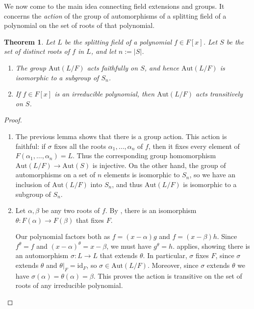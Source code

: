 \documentclass[12pt]{report}
\newtheorem{theorem}{Theorem}[chapter]
\numberwithin{equation}{section}
\numberwithin{theorem}{chapter}
\theoremstyle{definition}
\newtheorem*{basic properties}{Basic Properties}
\newtheorem*{Important Remark}{Important Remark}
\begin{document}
We now come to the main idea connecting field extensions and groups. It concerns the {\em action} of the group of automorphisms of a splitting field of a polynomial on the set of roots of that polynomial.

\begin{theorem}\label{aut splitting field sn}
Let $L$ be the splitting field of a polynomial $f \in F[x]$. Let $S$ be the set of distinct roots of $f$ in $L$, and let $n := |S|$. 

\begin{enumerate}[label=\alph*),leftmargin=15pt]
\item The group $\mathrm{Aut}(L/F)$ acts faithfully on $S$, and hence $\mathrm{Aut}(L/F)$ is isomorphic to a subgroup of $S_n$. 
\item If $f \in F[x]$ is an irreducible polynomial, then $\mathrm{Aut}(L/F)$ acts transitively on $S$.
\end{enumerate}
\end{theorem}


\begin{proof}$\,$
\begin{enumerate}[label=\alph*),leftmargin=15pt]
\item The previous lemma shows that there is a group action. This action is faithful: if $\sigma$ fixes all the roots $\alpha_1, \dots, \alpha_n$ of $f$, then it fixes every element of $F(\alpha_1, \dots, \alpha_n) = L$. Thus the corresponding group homomorphism $\mathrm{Aut}(L/F) \to \mathrm{Aut}(S)$ is injective. On the other hand, the group of automorphisms on a set of $n$ elements is isomorphic to $S_n$, so we have an inclusion of $\mathrm{Aut}(L/F)$ into $S_n$, and thus $\mathrm{Aut}(L/F)$ is isomorphic to a subgroup of $S_n$.

\item Let $\alpha, \beta$ be any two roots of $f$. By , there is an isomorphism $\theta\!: F(\alpha) \to F(\beta)$ that fixes $F$. 

Our polynomial factors both as $f = (x-\alpha)g$ and $f = (x-\beta) h$. Since $f^\theta = f$ and $(x-\alpha)^\theta = x -\beta$, we must have $g^\theta = h$.  applies, showing there is an automorphism
$\sigma: L \to L$ that extends $\theta$. In particular, $\sigma$ fixes $F$, since $\sigma$ extends $\theta$ and $\theta|_F = \mathrm{id}_F$, so $\sigma \in \mathrm{Aut}(L/F)$. Moreover, since $\sigma$ extends $\theta$ we have $\sigma(\alpha) = \theta(\alpha) = \beta$. This proves the action is transitive on the set of roots of any irreducible polynomial.\qedhere
\end{enumerate}
\end{proof}
\end{document}
